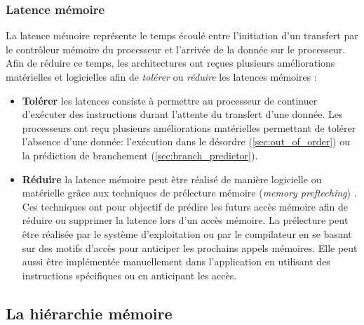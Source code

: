             
        
        


    \subsubsection{Latence mémoire}
    
        La latence mémoire représente le temps écoulé entre l’initiation d’un transfert par le contrôleur mémoire du processeur et l'arrivée de la donnée sur le processeur. Afin de réduire ce temps, les architectures ont reçues plusieurs améliorations matérielles et logicielles afin de \textit{tolérer} ou \textit{réduire} les latences mémoires \cite{Efnusheva2017ASO}:
        \begin{itemize}
            \item \textbf{Tolérer} les latences \cite{Bakshi2000} consiste à permettre au processeur de continuer d’exécuter des instructions durant l'attente du transfert d'une donnée. Les processeurs ont reçu plusieurs améliorations matérielles permettant de tolérer l'absence d'une donnée: l’exécution dans le désordre (\autoref{sec:out_of_order}) ou la prédiction de branchement (\autoref{sec:branch_predictor}).
            
            \item \textbf{Réduire} la latence mémoire peut être réalisé de manière logicielle ou matérielle grâce aux techniques de prélecture mémoire (\textit{memory prefteching}) \cite{baer1991effective, mowry1991tolerating}. Ces techniques ont pour objectif de prédire les futurs accès mémoire afin de réduire ou supprimer la latence lors d'un accès mémoire. La prélecture peut être réalisée par le système d'exploitation ou par le compilateur en se basant sur des motifs d'accès pour anticiper les prochains appels mémoires. Elle peut aussi être implémentée manuellement dans l'application en utilisant des instructions spécifiques ou en anticipant les accès. 
        \end{itemize}
        
       
        
   
\subsection{La hiérarchie mémoire}\label{sec:hierarchie_true}



